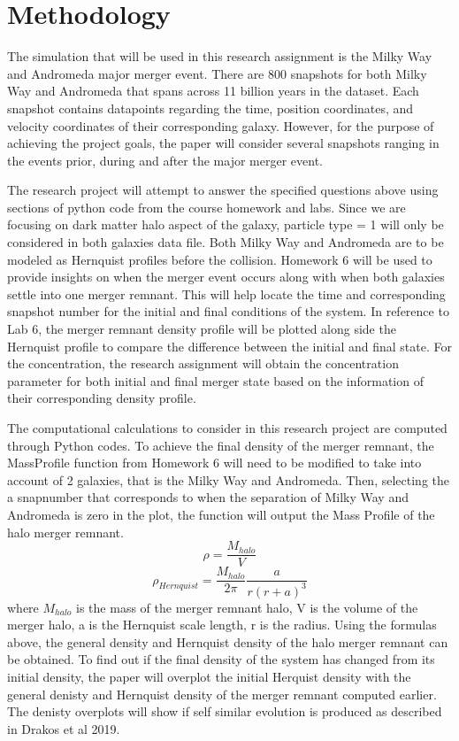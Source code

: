 \documentclass[twocolumn]{aastex63}
\begin{document}
\section{Methodology}
The simulation that will be used in this research assignment is the Milky Way and Andromeda major merger event. There are 800 snapshots for both Milky Way and Andromeda that spans across 11 billion years in the dataset. Each snapshot contains datapoints regarding the time, position coordinates, and velocity coordinates of their corresponding galaxy. However, for the purpose of achieving the project goals, the paper will consider several snapshots ranging in the events prior, during and after the major merger event.\par 
The research project will attempt to answer the specified questions above using sections of python code from the course homework and labs. Since we are focusing on dark matter halo aspect of the galaxy, particle type = 1 will only be considered in both galaxies data file. Both Milky Way and Andromeda are to be modeled as Hernquist profiles before the collision. Homework 6 will be used to provide insights on when the merger event occurs along with when both galaxies settle into one merger remnant. This will help locate the time and corresponding snapshot number for the initial and final conditions of the system. In reference to Lab 6, the merger remnant density profile will be plotted along side the Hernquist profile to compare the difference between the initial and final state. For the concentration, the research assignment will obtain the concentration parameter for both initial and final merger state based on the information of their corresponding density profile.\par
The computational calculations to consider in this research project are computed through Python codes. To achieve the final density of the merger remnant, the MassProfile function from Homework 6 will need to be modified to take into account of 2 galaxies, that is the Milky Way and Andromeda. Then, selecting the a snapnumber that corresponds to when the separation of Milky Way and Andromeda is zero in the plot, the function will output the Mass Profile of the halo merger remnant.
\[ \rho = \frac{M_{halo}}{V} \] 
\[ \rho_{Hernquist} = \frac{M_{halo}}{2\pi} \frac{a}{r(r+a)^3} \] 
where $M_{halo}$ is the mass of the merger remnant halo, V is the volume of the merger halo, a is the Hernquist scale length, r is the radius. Using the formulas above, the general density and Hernquist density of the halo merger remnant can be obtained. To find out if the final density of the system has changed from its initial density, the paper will overplot the initial Herquist density with the general denisty and Hernquist density of the merger remnant computed earlier. The denisty overplots will show if self similar evolution is produced as described in Drakos et al 2019.
\end{document}
